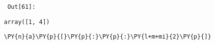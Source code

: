         {\par%
        \vspace{-1\smallerfontscale}%
        \noindent%
        \begin{minipage}{\cellleftmargin}%
    \hfill%
    {\smaller%
    \tt%
    \color{nbframe-out-prompt}%
    Out[61]:}%
    \hspace{\inputpadding}%
    \hspace{0em}%
    \hspace{3pt}%
    \end{minipage}%
        }%
    \begin{addmargin}[\cellleftmargin]{0em}%
    {\smaller%
    \vspace{-1\smallerfontscale}%
    
    
    
    \begin{verbatim}
array([1, 4])
    \end{verbatim}

    
}%
    \end{addmargin}%

{\par%
\vspace{-1\baselineskip}%
}%
\begin{notebookcell}[62]%
\begin{addmargin}[\cellleftmargin]{0em}%
{\smaller%
\par%
%
\vspace{-1\smallerfontscale}%
\begin{Verbatim}[commandchars=\\\{\}]
\PY{n}{a}\PY{p}{[}\PY{p}{:}\PY{p}{:}\PY{l+m+mi}{2}\PY{p}{]}
\end{Verbatim}
%
\par%
\vspace{-1\smallerfontscale}}%
\end{addmargin}
\end{notebookcell}

\par\vspace{1\smallerfontscale}%
    
